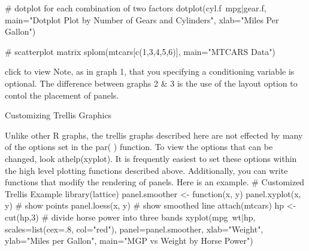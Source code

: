 # dotplot for each combination of two factors 
dotplot(cyl.f~mpg|gear.f, 
main="Dotplot Plot by Number of Gears and Cylinders",
xlab="Miles Per Gallon")

# scatterplot matrix 
splom(mtcars[c(1,3,4,5,6)], 
main="MTCARS Data")


click to view
Note, as in graph 1, that you specifying a conditioning variable is optional. The difference between graphs 2 & 3 is the use of the layout option to contol the placement of panels.

Customizing Trellis Graphics


Unlike other R graphs, the trellis graphs described here are not effected by many of the options set in the par( ) function. To view the options that can be changed, look athelp(xyplot). It is frequently easiest to set these options within the high level plotting functions described above. Additionally, you can write functions that modify the rendering of panels. Here is an example.
# Customized Trellis Example
library(lattice)
panel.smoother <- function(x, y) {
	panel.xyplot(x, y) # show points 
	panel.loess(x, y)  # show smoothed line 
}
attach(mtcars)
hp <- cut(hp,3) # divide horse power into three bands 
xyplot(mpg~wt|hp, scales=list(cex=.8, col="red"),
panel=panel.smoother,
xlab="Weight", ylab="Miles per Gallon", 
main="MGP vs Weight by Horse Power")

